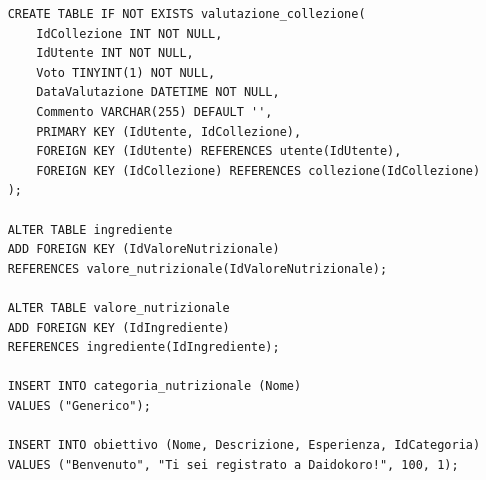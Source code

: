 ﻿\documentclass[a4paper,12pt]{report}
\begin{document}
\begin{verbatim}
    CREATE TABLE IF NOT EXISTS valutazione_collezione(
        IdCollezione INT NOT NULL,
        IdUtente INT NOT NULL,
        Voto TINYINT(1) NOT NULL,
        DataValutazione DATETIME NOT NULL,
        Commento VARCHAR(255) DEFAULT '',
        PRIMARY KEY (IdUtente, IdCollezione),
        FOREIGN KEY (IdUtente) REFERENCES utente(IdUtente),
        FOREIGN KEY (IdCollezione) REFERENCES collezione(IdCollezione)
    );
    
    ALTER TABLE ingrediente
    ADD FOREIGN KEY (IdValoreNutrizionale)
    REFERENCES valore_nutrizionale(IdValoreNutrizionale);
    
    ALTER TABLE valore_nutrizionale
    ADD FOREIGN KEY (IdIngrediente)
    REFERENCES ingrediente(IdIngrediente);
    
    INSERT INTO categoria_nutrizionale (Nome)
    VALUES ("Generico");
    
    INSERT INTO obiettivo (Nome, Descrizione, Esperienza, IdCategoria)
    VALUES ("Benvenuto", "Ti sei registrato a Daidokoro!", 100, 1);
    \end{verbatim}
    
\end{document}
